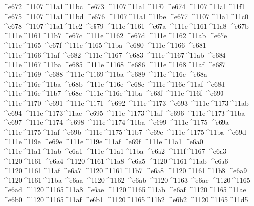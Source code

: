 \checkit ^^^^e672 ^^^^1107^^^^11a1^^^^11bc
\checkit ^^^^e673 ^^^^1107^^^^11a1^^^^11f0
\checkit ^^^^e674 ^^^^1107^^^^11a1^^^^11f1
\checkit ^^^^e675 ^^^^1107^^^^11a1^^^^11bd
\checkit ^^^^e676 ^^^^1107^^^^11a1^^^^11be
\checkit ^^^^e677 ^^^^1107^^^^11a1^^^^11c0
\checkit ^^^^e678 ^^^^1107^^^^11a1^^^^11c2
\checkit ^^^^e679 ^^^^111e^^^^1161
\checkit ^^^^e67a ^^^^111e^^^^1161^^^^11a8
\checkit ^^^^e67b ^^^^111e^^^^1161^^^^11b7
\checkit ^^^^e67c ^^^^111e^^^^1162
\checkit ^^^^e67d ^^^^111e^^^^1162^^^^11ab
\checkit ^^^^e67e ^^^^111e^^^^1165
\checkit ^^^^e67f ^^^^111e^^^^1165^^^^11ba
\checkit ^^^^e680 ^^^^111e^^^^1166
\checkit ^^^^e681 ^^^^111e^^^^1166^^^^11af
\checkit ^^^^e682 ^^^^111e^^^^1167
\checkit ^^^^e683 ^^^^111e^^^^1167^^^^11ab
\checkit ^^^^e684 ^^^^111e^^^^1167^^^^11ba
\checkit ^^^^e685 ^^^^111e^^^^1168
\checkit ^^^^e686 ^^^^111e^^^^1168^^^^11af
\checkit ^^^^e687 ^^^^111e^^^^1169
\checkit ^^^^e688 ^^^^111e^^^^1169^^^^11ba
\checkit ^^^^e689 ^^^^111e^^^^116c
\checkit ^^^^e68a ^^^^111e^^^^116c^^^^11ba
\checkit ^^^^e68b ^^^^111e^^^^116e
\checkit ^^^^e68c ^^^^111e^^^^116e^^^^11af
\checkit ^^^^e68d ^^^^111e^^^^116e^^^^11b7
\checkit ^^^^e68e ^^^^111e^^^^116e^^^^11ba
\checkit ^^^^e68f ^^^^111e^^^^116f
\checkit ^^^^e690 ^^^^111e^^^^1170
\checkit ^^^^e691 ^^^^111e^^^^1171
\checkit ^^^^e692 ^^^^111e^^^^1173
\checkit ^^^^e693 ^^^^111e^^^^1173^^^^11ab
\checkit ^^^^e694 ^^^^111e^^^^1173^^^^11ae
\checkit ^^^^e695 ^^^^111e^^^^1173^^^^11af
\checkit ^^^^e696 ^^^^111e^^^^1173^^^^11ba
\checkit ^^^^e697 ^^^^111e^^^^1174
\checkit ^^^^e698 ^^^^111e^^^^1174^^^^11ba
\checkit ^^^^e699 ^^^^111e^^^^1175
\checkit ^^^^e69a ^^^^111e^^^^1175^^^^11af
\checkit ^^^^e69b ^^^^111e^^^^1175^^^^11b7
\checkit ^^^^e69c ^^^^111e^^^^1175^^^^11ba
\checkit ^^^^e69d ^^^^111e^^^^119e
\checkit ^^^^e69e ^^^^111e^^^^119e^^^^11af
\checkit ^^^^e69f ^^^^111e^^^^11a1
\checkit ^^^^e6a0 ^^^^111e^^^^11a1^^^^11ab
\checkit ^^^^e6a1 ^^^^111e^^^^11a1^^^^11ba
\checkit ^^^^e6a2 ^^^^111f^^^^1167
\checkit ^^^^e6a3 ^^^^1120^^^^1161
\checkit ^^^^e6a4 ^^^^1120^^^^1161^^^^11a8
\checkit ^^^^e6a5 ^^^^1120^^^^1161^^^^11ab
\checkit ^^^^e6a6 ^^^^1120^^^^1161^^^^11af
\checkit ^^^^e6a7 ^^^^1120^^^^1161^^^^11b7
\checkit ^^^^e6a8 ^^^^1120^^^^1161^^^^11b8
\checkit ^^^^e6a9 ^^^^1120^^^^1161^^^^11ba
\checkit ^^^^e6aa ^^^^1120^^^^1162
\checkit ^^^^e6ab ^^^^1120^^^^1163
\checkit ^^^^e6ac ^^^^1120^^^^1165
\checkit ^^^^e6ad ^^^^1120^^^^1165^^^^11a8
\checkit ^^^^e6ae ^^^^1120^^^^1165^^^^11ab
\checkit ^^^^e6af ^^^^1120^^^^1165^^^^11ae
\checkit ^^^^e6b0 ^^^^1120^^^^1165^^^^11af
\checkit ^^^^e6b1 ^^^^1120^^^^1165^^^^11b2
\checkit ^^^^e6b2 ^^^^1120^^^^1165^^^^11d5
